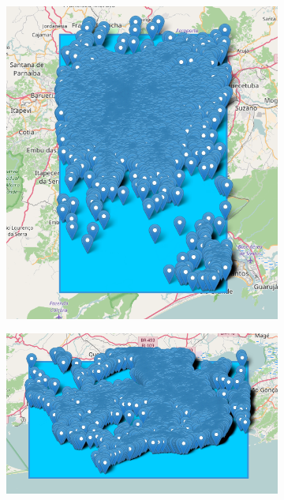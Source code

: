 \begin{figure}[htbp]
	\begin{subfigure}[htbp]{0.4\textwidth}
		\centering
		\includegraphics[width=1\linewidth]{figures/sp_markers.png}
		\caption{}
		\label{subfig:saopaulo_markers}
	\end{subfigure}
	\quad
		\begin{subfigure}[htbp]{0.5\textwidth}
			\centering
			\includegraphics[width=1\linewidth]{figures/rio_markers.png}
			\caption{}
			\label{subfig:riodejaneiro_markers}
		\end{subfigure}
		

\end{figure}
